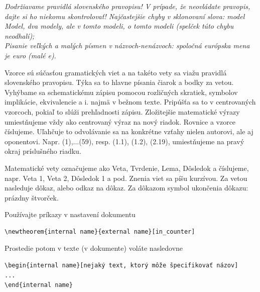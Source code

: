 {\it 
Dodržiavame pravidlá slovenského pravopisu! V prípade, že neovládate pravopis, dajte si ho niekomu skontrolovať!  Najčastejšie chyby v sklonovaní slova: model \\
Model, dva modely, ale v tomto modeli, o tomto modeli (spelček túto chybu neodhalí);\\
Pisanie veľkých a malých písmen v názvoch-nenázvoch: spoločná európska mena je euro (malé e).

Vzorce sú súčasťou gramatických viet a na takéto vety sa viažu pravidlá slovenského pravopisu. Týka sa to hlavne písania čiarok a bodky za vetou. Vyhýbame sa schematickému zápisu pomocou rozličných skratiek, symbolov implikácie, ekvivalencie a i.  najmä v bežnom texte. Pripúšťa sa to v centrovaných vzorcoch, pokiaľ to slúži prehľadnosti zápisu. Zložitejšie matematické výrazy umiestňujeme vždy ako centrovaný výraz na nový riadok. Rovnice a vzorce číslujeme.  Uľahčuje to odvolávanie sa na konkrétne vzťahy nielen autorovi, ale aj oponentovi.  Napr. (1),...(59), resp. (1.1), (1.2),  (2.19), umiestňujeme na pravý okraj príslušného riadku. 

Matematické vety označujeme ako Veta, Tvrdenie, Lema, Dôsledok a číslujeme, napr. Veta 1, Veta 2,  Dôsledok 1 a pod.  Znenia viet sa píšu kurzívou. Za vetou nasleduje dôkaz, alebo odkaz na dôkaz. Za dôkazom symbol ukončenia dôkazu: prázdny štvorček.

Používajte príkazy v nastavení dokumentu
\begin{verbatim}
\newtheorem{internal name}{external name}[in_counter]  
\end{verbatim}

Prostedie  potom v texte (v dokumente) voláte nasledovne
\begin{verbatim}
\begin{internal name}[nejaký text, ktorý môže špecifikovať názov]
...
\end{internal name}
\end{verbatim}
}